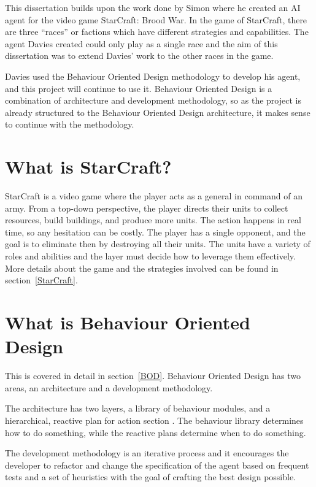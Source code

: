 \documentclass[11pt,openright,a4paper]{report}
\begin{document}
This dissertation builds upon the work done by Simon  where he created an AI agent for the video game StarCraft: Brood War. In the game of StarCraft, there are three ``races'' or factions which have different strategies and capabilities. The agent Davies created could only play as a single race and the aim of this dissertation was to extend Davies' work to the other races in the game.

Davies used the Behaviour Oriented Design methodology \cite{bryson2003behavior} to develop his agent, and this project will continue to use it. Behaviour Oriented Design is a combination of architecture and development methodology, so as the project is already structured to the Behaviour Oriented Design architecture, it makes sense to continue with the methodology.

\section{What is StarCraft?}
 StarCraft is a video game where the player acts as a general in command of an army. From a top-down perspective, the player directs their units to collect resources, build buildings, and produce more units. The action happens in real time, so any hesitation can be costly. The player has a single opponent, and the goal is to eliminate then by destroying all their units. The units have a variety of roles and abilities and the layer must decide how to leverage them effectively. More details about the game and the strategies involved can be found in section~\ref{StarCraft}.

\section{What is Behaviour Oriented Design}
 This is covered in detail in section~\ref{BOD}. Behaviour Oriented Design has two areas, an architecture and a development methodology.

 The architecture has two layers, a library of behaviour modules, and a hierarchical, reactive plan for action section \cite{bryson2003behavior}. The behaviour library determines how to do something, while the reactive plans determine when to do something.

The development methodology is an iterative process and it encourages the developer to refactor and change the specification of the agent based on frequent tests and a set of heuristics with the goal of crafting the best design possible.
\end{document}
